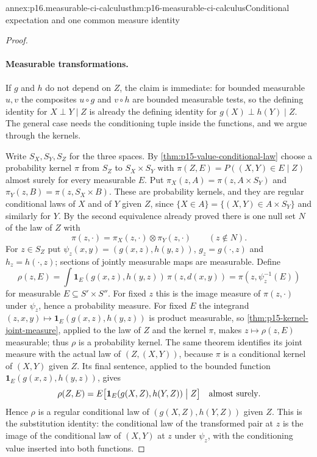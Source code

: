 \begin{annexitem}{annex:p16.measurable-ci-calculus}{thm:p16-measurable-ci-calculus}{Conditional expectation and one common measure identity}
\begin{proof}
\paragraph{Measurable transformations.}
If \(g\) and \(h\) do not depend on \(Z\), the claim is immediate:
for bounded measurable \(u,v\) the composites \(u\circ g\) and
\(v\circ h\) are bounded measurable tests, so the defining identity
for \(X\perp Y\mid Z\) is already the defining identity for
\(g(X)\perp h(Y)\mid Z\). The general case needs the conditioning
tuple inside the functions, and we argue through the kernels.

Write \(S_X,S_Y,S_Z\) for the three spaces. By
\cref{thm:p15-value-conditional-law} choose a probability kernel
\(\pi\) from \(S_Z\) to \(S_X\times S_Y\) with
\(\pi(Z,E)=P((X,Y)\in E\mid Z)\) almost surely for every measurable
\(E\). Put \(\pi_X(z,A)=\pi(z,A\times S_Y)\) and
\(\pi_Y(z,B)=\pi(z,S_X\times B)\). These are probability kernels, and
they are regular conditional laws of \(X\) and of \(Y\) given \(Z\),
since \(\{X\in A\}=\{(X,Y)\in A\times S_Y\}\) and similarly for \(Y\).
By the second equivalence already proved there is one null set \(N\)
of the law of \(Z\) with
\[
 \pi(z,\cdot)=\pi_X(z,\cdot)\otimes\pi_Y(z,\cdot)
 \qquad(z\notin N).
\]
For \(z\in S_Z\) put \(\psi_z(x,y)=(g(x,z),h(y,z))\), \(g_z=g(\cdot,z)\)
and \(h_z=h(\cdot,z)\); sections of jointly measurable maps are
measurable. Define
\[
 \rho(z,E)=\int\mathbf 1_E(g(x,z),h(y,z))\,\pi(z,d(x,y))
          =\pi(z,\psi_z^{-1}(E))
\]
for measurable \(E\subseteq S'\times S''\). For fixed \(z\) this is
the image measure of \(\pi(z,\cdot)\) under \(\psi_z\), hence a
probability measure. For fixed \(E\) the integrand
\((z,x,y)\mapsto\mathbf 1_E(g(x,z),h(y,z))\) is product measurable, so
\cref{thm:p15-kernel-joint-measure}, applied to the law of \(Z\) and
the kernel \(\pi\), makes \(z\mapsto\rho(z,E)\) measurable; thus
\(\rho\) is a probability kernel. The same theorem identifies its joint
measure with the actual law of \((Z,(X,Y))\), because \(\pi\) is a
conditional kernel of \((X,Y)\) given \(Z\). Its final sentence, applied
to the bounded function \(\mathbf 1_E(g(x,z),h(y,z))\), gives
\[
 \rho(Z,E)=E\bigl[\mathbf 1_E(g(X,Z),h(Y,Z))\bigm| Z\bigr]
 \quad\text{almost surely}.
\]
Hence \(\rho\) is a regular conditional law of
\((g(X,Z),h(Y,Z))\) given \(Z\). This is the substitution identity:
the conditional law of the transformed pair at \(z\) is the image of
the conditional law of \((X,Y)\) at \(z\) under \(\psi_z\), with the
conditioning value inserted into both functions.


\end{proof}
\end{annexitem}
